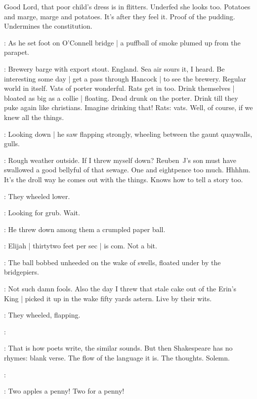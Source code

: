 Good Lord, that poor child's dress is in flitters.
Underfed she looks too.
Potatoes and marge,
marge and potatoes.
It's after they feel it.
Proof of the pudding.
Undermines the constitution.

:
As he set foot on O'Connell bridge |
a puffball of smoke plumed up from the parapet.

\BloomInt:
Brewery barge with export stout.
England.
Sea air sours it, I heard.
Be interesting some day |
get a pass through Hancock |
to see the brewery.
Regular world in itself.
Vats of porter wonderful.
Rats get in too.
Drink themselves |
bloated as big as a collie |
floating.
Dead drunk on the porter.
Drink till they puke again like christians.
Imagine drinking that!
Rats: vats.
Well, of course,
if we knew all the things.

:
Looking down |
he saw flapping strongly,
wheeling between the gaunt quaywalls,
gulls.

\BloomInt:
Rough weather outside.
If I threw myself down?
Reuben~J's son must have swallowed a good bellyful of that sewage.
One and eightpence too much.
Hhhhm.
It's the droll way he comes out with the things.
Knows how to tell a story too.

:
They wheeled lower.

\BloomInt:
Looking for grub.
Wait.

:
He threw down among them a crumpled paper ball.

\BloomInt:
Elijah |
thirtytwo feet per sec |
is com.
Not a bit.

:
The ball bobbed unheeded on the wake of swells,
floated under by the bridgepiers.

\BloomInt:
Not such damn fools.
Also the day I threw that stale cake out of the Erin's King |
picked it up in the wake fifty yards astern.
Live by their wits.

:
They wheeled,
flapping.

\BloomInt:

\BloomInt:
That is how poets write, the similar sounds.
But then Shakespeare has no rhymes:
blank verse.
The flow of the language it is.
The thoughts.
Solemn.

\BloomInt:

\woman:
Two apples a penny!
Two for a penny!

